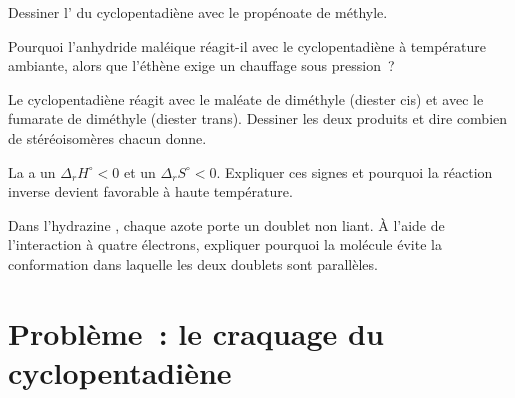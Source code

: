 \begin{exercise}[$\star\star$]\label{exo:b2:frontier-orbitals:8}
Dessiner l' du cyclopentadiène avec le propénoate de méthyle.
\end{exercise}

\begin{exercise}[$\star\star$]\label{exo:b2:frontier-orbitals:9}
Pourquoi l'anhydride maléique réagit-il avec le cyclopentadiène à température ambiante, alors que l'éthène
exige un chauffage sous pression~?
\end{exercise}

\begin{exercise}[$\star\star\star$]\label{exo:b2:frontier-orbitals:10}
Le cyclopentadiène réagit avec le maléate de diméthyle (diester cis) et avec le fumarate de diméthyle
(diester trans). Dessiner les deux produits et dire combien de stéréoisomères chacun donne.
\end{exercise}

\begin{exercise}[$\star\star\star$]\label{exo:b2:frontier-orbitals:11}
La  a un $\Delta_r H^\circ < 0$ et un $\Delta_r S^\circ < 0$. Expliquer ces signes
et pourquoi la réaction inverse devient favorable à haute température.
\end{exercise}

\begin{exercise}[$\star\star\star$]\label{exo:b2:frontier-orbitals:12}
Dans l'hydrazine , chaque azote porte un doublet non liant. À l'aide de l'interaction à
quatre électrons, expliquer pourquoi la molécule évite la conformation dans laquelle les deux doublets
sont parallèles.
\end{exercise}

\section{Problème~: le craquage du cyclopentadiène}

